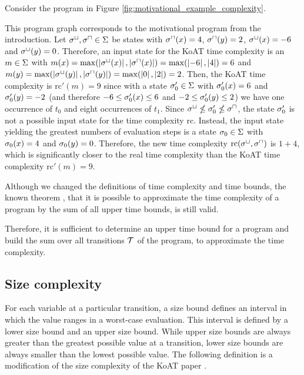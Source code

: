 \begin{example}
  Consider the program in Figure \ref{fig:motivational_example_complexity}.
  
  This program graph corresponds to the motivational program from the introduction.
  Let ${\sigma^\sqcup}, {\sigma^\sqcap} \in \Sigma$ be states with ${\sigma^\sqcap}(x) = 4$, ${\sigma^\sqcap}(y) = 2$, ${\sigma^\sqcup}(x) = -6$ and ${\sigma^\sqcup}(y) = 0$.
  Therefore, an input state for the KoAT time complexity \cite{koat} is an $m \in \Sigma$ with $m(x) = \max(\left|{\sigma^\sqcup}(x)\right|, \left|{\sigma^\sqcap}(x)\right|) = \max(\left|-6\right|, \left|4\right|) = 6$ and $m(y) = \max(\left|{\sigma^\sqcup}(y)\right|, \left|{\sigma^\sqcap}(y)\right|) = \max(\left|0\right|, \left|2\right|) = 2$.
  Then, the KoAT time complexity \cite{koat} is $\text{rc}'(m) = 9$ since with a state $\sigma'_0 \in \Sigma$ with $\sigma'_0(x) = 6$ and $\sigma'_0(y) = -2$ (and therefore $-6 \leq \sigma'_0(x) \leq 6$ and $-2 \leq \sigma'_0(y) \leq 2$) we have one occurrence of $t_0$ and eight occurrences of $t_1$.
  Since ${\sigma^\sqcup} \nleq \sigma'_0 \nleq {\sigma^\sqcap}$, the state $\sigma'_0$ is not a possible input state for the time complexity $\text{rc}$.
  Instead, the input state yielding the greatest numbers of evaluation steps is a state $\sigma_0 \in \Sigma$ with $\sigma_0(x) = 4$ and $\sigma_0(y) = 0$.
  Therefore, the new time complexity $\text{rc}({\sigma^\sqcup}, {\sigma^\sqcap})$ is $1 + 4$, which is significantly closer to the real time complexity than the KoAT time complexity \cite{koat} $\text{rc}'(m) = 9$.
\end{example}
  
Although we changed the definitions of time complexity and time bounds, the known theorem \cite{koat}, that it is possible to approximate the time complexity of a program by the sum of all upper time bounds, is still valid.



Therefore, it is sufficient to determine an upper time bound for a program and build the sum over all transitions $\mathcal{T}$ of the program, to approximate the time complexity. 

\subsection{Size complexity}

For each variable at a particular transition, a size bound defines an interval in which the value ranges in a worst-case evaluation.
This interval is defined by a lower size bound and an upper size bound.
While upper size bounds are always greater than the greatest possible value at a transition, lower size bounds are always smaller than the lowest possible value.
The following definition is a modification of the size complexity of the KoAT paper \cite{koat}.

